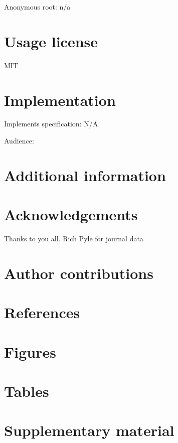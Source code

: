 \documentclass[
]{article}
\begin{document}
Anonymous root: n/a

\hypertarget{usage-license}{%
\section{Usage license}\label{usage-license}}

MIT

\hypertarget{implementation}{%
\section{Implementation}\label{implementation}}

Implements specification: N/A

Audience:

\hypertarget{additional-information}{%
\section{Additional information}\label{additional-information}}

\hypertarget{acknowledgements}{%
\section{Acknowledgements}\label{acknowledgements}}

Thanks to you all. Rich Pyle for journal data

\hypertarget{author-contributions}{%
\section{Author contributions}\label{author-contributions}}

\hypertarget{references}{%
\section{References}\label{references}}

\hypertarget{figures}{%
\section{Figures}\label{figures}}

\hypertarget{tables}{%
\section{Tables}\label{tables}}

\hypertarget{supplementary-material}{%
\section{Supplementary material}\label{supplementary-material}}
\end{document}

